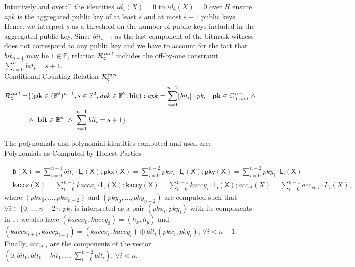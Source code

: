 \noindent Intuitively and overall the identities $id_1(X)=0$ to $id_6(X)=0$ over $H$ 
ensure $\mathit{apk}$ is the aggregated public key of at least $s$ and at most $s+1$ public keys. 
Hence, we interpret $s$ as a threshold on the number of public keys included in the aggregated public key. 
Since $\mathit{bit_{n-1}}$ as the last component of the bitmask witness does not correspond to any public 
key and we have to account for the fact that $\mathit{bit_{n-1}}$ may be 
$1 \in \mathbb{F}$, relation $\mathcal{R}^{\mathit{incl}}_{\mathsf{c}}$ includes the off-by-one constraint $\sum_{i=0}^{n-1} \mathit{bit_i} = s+1$.\\

\noindent \textsf{Conditional Counting Relation $\mathcal{R}^{\mathit{incl}}_{\mathsf{c}}$}  
\begin{equation*}
\begin{split}
 \Rvt = & \{(\mathbf{pk} \in (\mathbb{F}^2)^{n-1}, s \in \mathbb{F}^2, \mathit{apk} \in \mathbb{F}^2; \mathbf{bit}) : 
 \mathit{apk} = \sum_{i=0}^{n-2} [\mathit{bit_i}]  \cdot \mathit{pk_i} \ | \ \mathbf{pk}  \in \ginn{1}^{n-1} \ \wedge \\ 
& \wedge \ \mathbf{bit} \in \mathbb{B}^n \ \wedge \ \sum_{i=0}^{n-1} \mathit{bit_i} = s+1\} 
\end{split}
\end{equation*}

\noindent The polynomials and polynomial identities computed and used are: \\

\noindent \textsf{Polynomials as Computed by Honest Parties} 

\begin{align*}
&\mathsf{b(X)} = \sum_{i=0}^{n-1} \mathit{bit_i} \cdot \mathsf{L_i(X)}; \mathsf{pkx(X)} =  \sum_{i=0}^{n-2} \mathit{pkx_i} \cdot \mathsf{L_i(X)}; 
\mathsf{pky(X)} =  \sum_{i=0}^{n-2} \mathit{pky_i} \cdot \mathsf{L_i(X)} \\
&\mathsf{kaccx(X)}  =  \sum_{i=0}^{n-1} \mathit{kaccx_i} \cdot \mathsf{L_i(X)}; \mathsf{kaccy(X)}  = \sum_{i=0}^{n-1} \mathit{kaccy_i} \cdot \mathsf{L_i(X)}; 
acc_{vt}(X)  = \sum_{i=0}^{n-1} acc_{vt,i} \cdot L_i(X),
\end{align*}
\noindent where $(\mathit{pkx_0}, \ldots, \mathit{pkx_{n-2}})$ 
and $(\mathit{pky_0}, \ldots, \mathit{pky_{n-2}})$ are computed such that $\forall i \in \{0, \ldots, n-2\}$, $\mathit{pk_i}$ 
is interpreted as a pair $(\mathit{pkx_i}, \mathit{pky_i})$ with its components in $\mathbb{F}$; we also have 
$(\mathit{kaccx_{0}}, \mathit{kaccy_{0}}) = (\mathit{h_x}, \mathit{h_y})$ and 
$(\mathit{kaccx_{i+1}}, \mathit{kaccy_{i+1}}) =  (\mathit{kaccx_{i}}, \mathit{kaccy_{i}}) \oplus \mathit{bit_i}(\mathit{pkx_{i}}, \mathit{pky_{i}})$, 
$\forall i < n-1$. Finally, $acc_{vt,i}$ are the components of the vector 
$(0, \mathit{bit_0}, \mathit{bit_0} + \mathit{bit_1}, \ldots, \sum_{i=0}^{n-2}\mathit{bit_i})$, $\forall i < n$. \\

